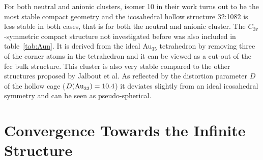 %
For both neutral and anionic clusters, isomer 10 in their work turns out to be
the most stable compact geometry and the icosahedral hollow structure 32:1082 is
less stable in both cases, that is for both the neutral and anionic cluster. The
$C_\mathrm{3v}$-symmetric compact structure not investigated before was also
included in table~\ref{tab:Aun}. It is derived from the ideal Au$_{35}$
tetrahedron by removing three of the corner atoms in the tetrahedron and it can
be viewed as a cut-out of the \ac{fcc} bulk structure. This cluster is also very
stable compared to the other structures proposed by Jalbout et al. As reflected
by the distortion parameter $D$ of the  hollow cage
($D(\ce{Au32})=10.4$) it deviates slightly from an ideal icosahedral symmetry
and can be seen as pseudo-spherical.
  
\section{Convergence Towards the Infinite Structure}

